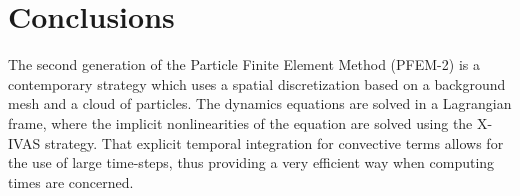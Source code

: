 \documentclass[review]{elsarticle}
\begin{document}





% 


\section{Conclusions}

The second generation of the Particle Finite Element Method (PFEM-2) is a contemporary strategy which uses a spatial discretization based on a background mesh and a cloud of particles. The dynamics equations are solved in a Lagrangian frame, where the implicit nonlinearities of the equation are solved using the {X-IVAS} strategy. That explicit temporal integration for convective terms allows for the use of large time-steps, thus providing a very efficient way when computing times are concerned.

\end{document}
